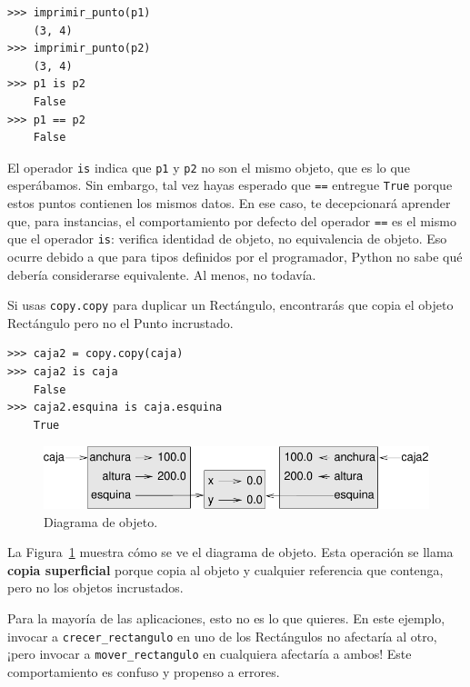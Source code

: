\documentclass[10pt]{book}
\begin{document}
\begin{verbatim}
>>> imprimir_punto(p1)
    (3, 4)
>>> imprimir_punto(p2)
    (3, 4)
>>> p1 is p2
    False
>>> p1 == p2
    False
\end{verbatim}
%
El operador {\tt is} indica que {\tt p1} y {\tt p2} no son el
mismo objeto, que es lo que esperábamos.  Sin embargo, tal vez hayas esperado
que {\tt ==} entregue {\tt True} porque estos puntos contienen los mismos
datos.  En ese caso, te decepcionará aprender que, para
instancias, el comportamiento por defecto del operador {\tt ==} es el mismo
que el operador {\tt is}: verifica identidad de objeto, no equivalencia
de objeto.  Eso ocurre debido a que para tipos definidos por el programador, Python no
sabe qué debería considerarse equivalente.  Al menos, no todavía.


Si usas {\tt copy.copy} para duplicar un Rectángulo, encontrarás
que copia el objeto Rectángulo pero no el Punto incrustado.

\begin{verbatim}
>>> caja2 = copy.copy(caja)
>>> caja2 is caja
    False
>>> caja2.esquina is caja.esquina
    True
\end{verbatim}

\begin{figure}
\centerline
{\includegraphics[scale=0.8]{figs/rectangle2.pdf}}
\caption{Diagrama de objeto.}
\label{fig.rectangle2}
\end{figure}

La Figura~\ref{fig.rectangle2} muestra cómo se ve el diagrama de objeto.
Esta operación se llama {\bf copia superficial} porque copia al
objeto y cualquier referencia que contenga, pero no los objetos incrustados.

Para la mayoría de las aplicaciones, esto no es lo que quieres.  En este ejemplo,
invocar a \verb"crecer_rectangulo" en uno de los Rectángulos no
afectaría al otro, ¡pero invocar a \verb"mover_rectangulo" en cualquiera
afectaría a ambos!  Este comportamiento es confuso y propenso a errores.
\end{document}
